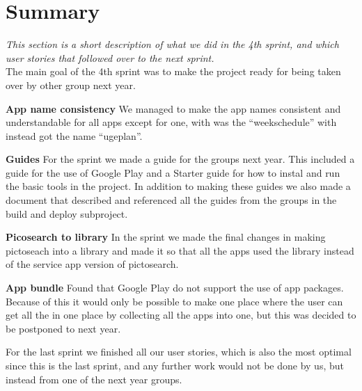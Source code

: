 \section{Summary} 
\textit{This section is a short description of what we did in the 4th sprint, and which user stories that followed over to the next sprint.}\\

The main goal of the 4th sprint was to make the project ready for being taken over by other group next year.


\textbf{App name consistency}
We managed to make the app names consistent and understandable for all apps except for one, with was the “weekschedule” with instead got the name “ugeplan”. 

\textbf{Guides}
For the sprint we made a guide for the groups next year. This included a guide for the use of Google Play and a Starter guide for how to instal and run the basic tools in the project. In addition to making these guides we also made a document that described and referenced all the guides from the groups in the build and deploy subproject.

\textbf{Picosearch to library}
In the sprint we made the final changes in making pictoseach into a library and made it so that all the apps used the library instead of the service app version of pictosearch.

\textbf{App bundle}
Found that Google Play do not support the use of app packages. Because of this it would only be possible to make one place where the user can get all the in one place by collecting all the apps into one, but this was decided to be postponed to next year.

For the last sprint we finished all our user stories, which is also the most optimal since this is the last sprint, and any further work would not be done by us, but instead from one of the next year groups.